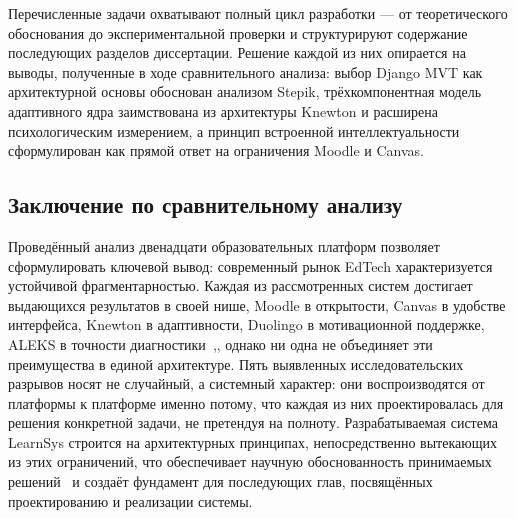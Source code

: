 Перечисленные задачи охватывают полный цикл разработки --- от
теоретического обоснования до экспериментальной проверки
и структурируют содержание последующих разделов диссертации.
Решение каждой из них опирается на выводы, полученные в ходе
сравнительного анализа: выбор Django MVT как архитектурной
основы обоснован анализом Stepik, трёхкомпонентная модель
адаптивного ядра заимствована из архитектуры Knewton и
расширена психологическим измерением, а принцип встроенной
интеллектуальности сформулирован как прямой ответ на
ограничения Moodle и Canvas.
\subsection{Заключение по сравнительному анализу}

Проведённый анализ двенадцати образовательных платформ
позволяет сформулировать ключевой вывод: современный рынок
EdTech характеризуется устойчивой фрагментарностью. Каждая
из рассмотренных систем достигает выдающихся результатов
в своей нише, Moodle в открытости, Canvas в удобстве
интерфейса, Knewton в адаптивности, Duolingo в мотивационной
поддержке, ALEKS в точности
диагностики~\cite{review_elearning_2016,
brusilovsky2007usermodels},, однако ни одна не объединяет
эти преимущества в единой архитектуре. Пять выявленных
исследовательских разрывов носят не случайный, а системный
характер: они воспроизводятся от платформы к платформе
именно потому, что каждая из них проектировалась для решения
конкретной задачи, не претендуя на полноту. Разрабатываемая
система LearnSys строится на архитектурных принципах,
непосредственно вытекающих из этих ограничений, что
обеспечивает научную обоснованность принимаемых
решений~\cite{woolf2009building, brusilovsky2001adaptive}
и создаёт фундамент для последующих глав, посвящённых
проектированию и реализации системы.
